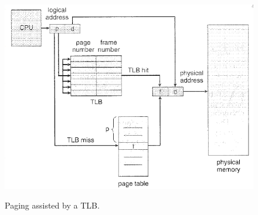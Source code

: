 \documentclass[10pt,a4paper]{article}
\begin{document}
\begin{figure}
\caption{Paging assisted by a TLB.\cite{OSCONCEPTS}}
\begin{center}
\includegraphics[scale=0.45]{../images/page-tlb.png}
\label{page-tlb}
\end{center}
\end{figure}
\end{document}
